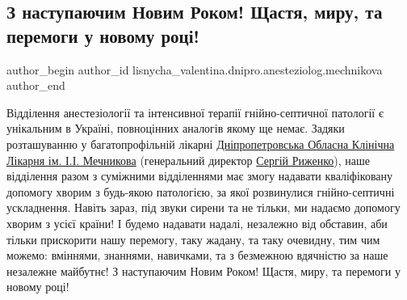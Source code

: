  
 
 
 
 

\subsection{З наступаючим Новим Роком! Щастя, миру, та перемоги у новому році!}
\label{sec:30_12_2022.fb.lisnycha_valentina.dnipro.anesteziolog.mechnikova.1.z_nastupayuchim_novi}

\ifcmt
 author_begin
   author_id lisnycha_valentina.dnipro.anesteziolog.mechnikova
 author_end
\fi

Відділення анестезіології та інтенсивної терапії гнійно-септичної патології є
унікальним в Україні, повноцінних аналогів якому ще немає. Задяки розташуванню
у багатопрофільній лікарні \href{https://www.facebook.com/MechnikovaBoln/}{Дніпропетровська Обласна Клінічна Лікарня ім. І.І.
Мечникова} (генеральний директор \href{https://www.facebook.com/rsa010963}{Сергій Риженко}), наше відділення разом з
суміжними відділеннями має змогу надавати кваліфіковану допомогу хворим з
будь-якою патологією, за якої розвинулися гнійно-септичні ускладнення. Навіть
зараз, під звуки сирени та не тільки, ми надаємо допомогу хворим з усієї
країни! І будемо надавати надалі, незалежно від обставин, аби тільки прискорити
нашу перемогу, таку жадану, та таку очевидну, тим чим можемо: вміннями,
знаннями, навичками, та з безмежною вдячністю за наше незалежне майбутнє! З
наступаючим Новим Роком! Щастя, миру, та перемоги у новому році!
